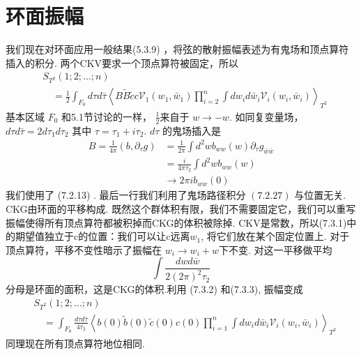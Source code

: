 \section{环面振幅}%
我们现在对环面应用一般结果(5.3.9) ，将弦的散射振幅表述为有鬼场和顶点算符插入的积分. 两个CKV要求一个顶点算符被固定，所以
\begin{equation}
	\begin{aligned}
		&S_{T^{2}}(1 ; 2 ; \ldots ; n) \\
		&\quad=\frac{1}{2} \int_{F_{0}} d \tau d \bar{\tau}\left\langle B \tilde{B} \tilde{c} c \mathscr{V}_{1}\left(w_{1}, \bar{w}_{1}\right) \prod_{i=2}^{n} \int d w_{i} d \bar{w}_{i} \mathscr{V}_{i}\left(w_{i}, \bar{w}_{i}\right)\right\rangle_{T^{2}}
	\end{aligned}
\end{equation}
基本区域 $F_{0}$ 和5.1节讨论的一样， $\frac{1}{2}$来自于 $w \rightarrow-w$. 如同复变量场，$d \tau d \bar{\tau}=2 d \tau_{1} d \tau_{2}$ 其中 $\tau=\tau_{1}+i \tau_{2}$.  $d \tau$ 的鬼场插入是
\begin{equation}
	\begin{aligned}
		B=\frac{1}{4 \pi}\left(b, \partial_{\tau} g\right) &=\frac{1}{2 \pi} \int d^{2} w b_{w w}(w) \partial_{\tau} g_{\bar{w} \bar{w}} \\
		&=\frac{i}{4 \pi \tau_{2}} \int d^{2} w b_{w w}(w) \\
		& \rightarrow 2 \pi i b_{w w}(0)
	\end{aligned}
\end{equation}
我们使用了 (7.2.13) . 最后一行我们利用了鬼场路径积分 $(7.2 .27)$ 与位置无关. \\
CKG由环面的平移构成. 既然这个群体积有限，我们不需要固定它，我们可以重写振幅使得所有顶点算符都被积掉而CKG的体积被除掉. CKV是常数，所以(7.3.1)中的期望值独立于c的位置：我们可以让c远离$w_{1}$, 将它们放在某个固定位置上. 对于顶点算符，平移不变性暗示了振幅在 $w_{i} \rightarrow w_{i}+w$下不变. 对这一平移做平均
\begin{equation}
	\int \frac{d w d \bar{w}}{2(2 \pi)^{2} \tau_{2}}
\end{equation}
分母是环面的面积，这是CKG的体积.利用 (7.3.2) 和(7.3.3), 振幅变成
\begin{equation}
	\begin{aligned}
		&S_{T^{2}}(1 ; 2 ; \ldots ; n) \\
		&\quad=\int_{F_{0}} \frac{d \tau d \bar{\tau}}{4 \tau_{2}}\left\langle b(0) \tilde{b}(0) \tilde{c}(0) c(0) \prod_{i=1}^{n} \int d w_{i} d \bar{w}_{i} \mathscr{V}_{i}\left(w_{i}, \bar{w}_{i}\right)\right\rangle_{T^{2}}
	\end{aligned}
\end{equation}
同理现在所有顶点算符地位相同.\\

